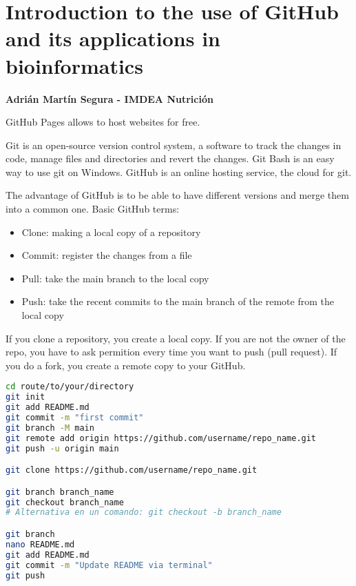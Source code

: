 \section{Introduction to the use of GitHub and its applications in bioinformatics}
\textbf{Adrián Martín Segura - IMDEA Nutrición}

GitHub Pages allows to host websites for free.

Git is an open-source version control system, a software to track the changes in code, manage files and directories and revert the changes. Git Bash is an easy way to use git on Windows. GitHub is an online hosting service, the cloud for git. 

The advantage of GitHub is to be able to have different versions and merge them into a common one. Basic GitHub terms: 
\begin{itemize}
\item Clone: making a local copy of a repository
\item Commit: register the changes from a file
\item Pull: take the main branch to the local copy
\item Push: take the recent commits to the main branch of the remote from the local copy
\end{itemize}

If you clone a repository, you create a local copy. If you are not the owner of the repo, you have to ask permition every time you want to push (pull request). If you do a fork, you create a remote copy to your GitHub.

\begin{lstlisting}[language = bash]
cd route/to/your/directory
git init
git add README.md
git commit -m "first commit"
git branch -M main
git remote add origin https://github.com/username/repo_name.git
git push -u origin main

git clone https://github.com/username/repo_name.git

git branch branch_name 
git checkout branch_name
# Alternativa en un comando: git checkout -b branch_name

git branch
nano README.md
git add README.md
git commit -m "Update README via terminal"
git push
\end{lstlisting}